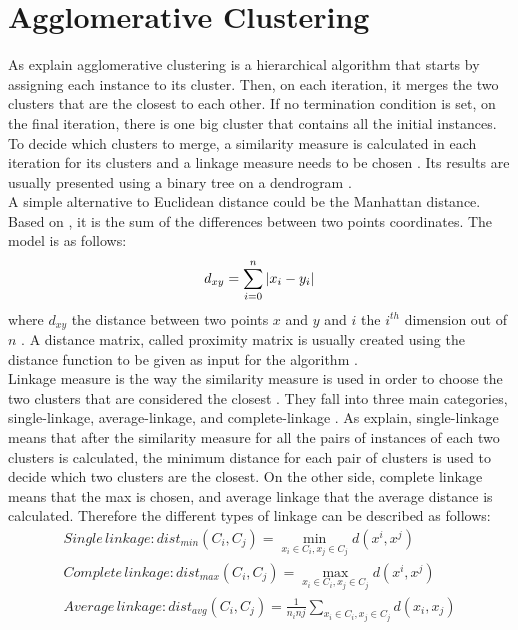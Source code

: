 \section{Agglomerative Clustering}
As \textcite{tanSteinKum,han} explain agglomerative clustering is a hierarchical algorithm that starts by assigning each instance to its cluster. Then, on each iteration, it merges the two clusters that are the closest to each other. If no termination condition is set, on the final iteration, there is one big cluster that contains all the initial instances. To decide which clusters to merge, a similarity measure is calculated in each iteration for its clusters and a linkage measure needs to be chosen \autocite{tanSteinKum,han}. Its results are usually presented using a binary tree on a dendrogram \autocite{survey}. \\
A simple alternative to Euclidean distance could be the Manhattan distance. Based on \textcite{manhattan}, it is the sum of the differences between two points coordinates. The model is as follows:
\begin{eqnarray*}
d_{xy} = \sum_{i=0}^{n}\abs{x_{i}-y_{i}}
\end{eqnarray*}
where \(d_{xy}\) the distance between two points \(x\) and \(y\) and \(i\) the \(i^{th}\) dimension out of \(n\) \autocite{manhattan}. A distance matrix, called proximity matrix is usually created using the distance function to be given as input for the algorithm \autocite{dunham, tanSteinKum}. \\
Linkage measure is the way the similarity measure is used in order to choose the two clusters that are considered the closest \autocite[260]{kantar}. They fall into three main categories, single-linkage, average-linkage, and complete-linkage \autocite[517]{tanSteinKum}. As \textcite{han} explain, single-linkage means that after the similarity measure for all the pairs of instances of each two clusters is calculated, the minimum distance for each pair of clusters is used to decide which two clusters are the closest. On the other side, complete linkage means that the max is chosen, and average linkage that the average distance is calculated. Therefore the different types of linkage can be described as follows:
\begin{eqnarray*}
Single\,linkage: dist_{min}(C_{i}, C_{j}) = \min\limits_{ x_{i} \in C_{i}, x_{j} \in C_{j}} d(x^{i}, x^{j}) \\
Complete\,linkage: dist_{max}(C_{i}, C_{j}) = \max\limits_{ x_{i} \in C_{i}, x_{j} \in C_{j}} d(x^{i}, x^{j}) \\
Average\,linkage: dist_{avg}(C_{i}, C_{j}) = \frac{1}{n_{i}n{j}}\sum_{ x_{i} \in C_{i}, x_{j} \in C_{j}}d(x_{i}, x_{j}) \\
\end{eqnarray*}
